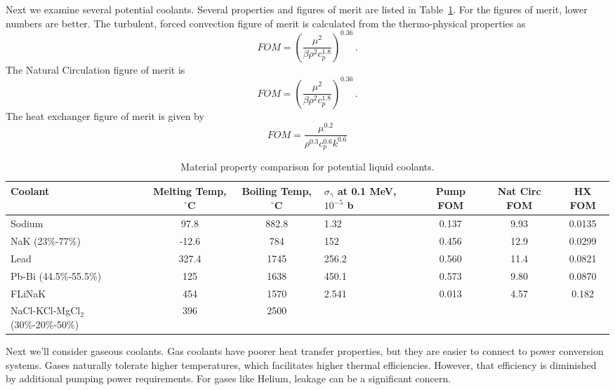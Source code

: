 \documentclass[]{report}
\begin{document}
Next we examine several potential coolants. Several properties and figures of merit are listed in Table~\ref{tab:coolant_properties}. For the figures of merit, lower numbers are better. The turbulent, forced convection figure of merit is calculated from the thermo-physical properties as 
\begin{equation}
FOM=\left(\frac{\mu^2}{\beta\rho^2c_p^{1.8} } \right)^{0.36}\,.
\end{equation}
The Natural Circulation figure of merit is
\begin{equation}
FOM= \left( \frac{\mu^2}{\beta\rho^2c_p^{1.8}}  \right)^{0.36} \,.
\end{equation}
 The heat exchanger figure of merit is given by 
\begin{equation}
FOM= \frac{\mu^{0.2}}{\rho^{0.3}c_p^{0.6}k^{0.6}}
\end{equation} 
 

\begin{table} \label{tab:coolant_properties}
\hspace*{-2cm} %
\begin{tabular}{|p{2.8cm}|c|c|p{2.5cm}|c|c|c|}
%
%
\hline
Coolant & Melting Temp, $^{\circ}$C & Boiling Temp, $^{\circ}$C & $\sigma_\gamma $ at 0.1 MeV, $10^{-5}$ b & Pump FOM & Nat Circ FOM & HX FOM \\
\hline
Sodium & 97.8 & 882.8 & 1.32 & 0.137 & 9.93 & 0.0135 \\
\hline
NaK (23\%-77\%) & -12.6 & 784 & 152 & 0.456 & 12.9 & 0.0299\\
\hline
Lead & 327.4 & 1745 & 256.2 & 0.560 & 11.4 & 0.0821\\
\hline
Pb-Bi (44.5\%-55.5\%) & 125 & 1638 & 450.1 & 0.573 & 9.80 & 0.0870\\
\hline
FLiNaK & 454 & 1570 & 2.541 & 0.013 & 4.57 & 0.182\\
\hline
NaCl-KCl-MgCl$_2$ (30\%-20\%-50\%) & 396 & 2500 &  &  &  & \\
\hline
\end{tabular}
\caption{Material property comparison for potential liquid coolants.\cite{IAEA_1}}
\end{table}

Next we'll consider gaseous coolants. Gas coolants have poorer heat transfer properties, but they are easier to connect to power conversion systems. Gases naturally tolerate higher temperatures, which facilitates higher thermal efficiencies. However, that efficiency is diminished by additional pumping power requirements.
For gases like Helium, leakage can be a significant concern. 
\end{document}
